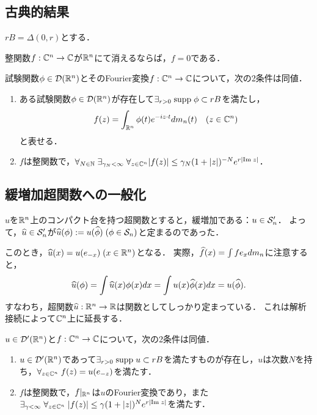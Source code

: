 \documentclass[uplatex,dvipdfmx]{jsreport}
\begin{document}
\subsection{古典的結果}

\begin{notation}
    $rB=\Delta(0,r)$とする．
\end{notation}

\begin{lemma}
    整関数$f:\C^n\to\C$が$\R^n$にて消えるならば，$f=0$である．
\end{lemma}

\begin{theorem}
    試験関数$\phi\in\D(\R^n)$とそのFourier変換$f:\C^n\to\C$について，次の2条件は同値．
    \begin{enumerate}
        \item ある試験関数$\phi\in\D(\R^n)$が存在して$\exists_{r>0}\;\supp\phi\subset rB$を満たし，
        \[f(z)=\int_{\R^n}\phi(t)e^{-iz\cdot t}dm_n(t)\quad(z\in\C^n)\]
        と表せる．
        \item $f$は整関数で，$\forall_{N\in\N}\;\exists_{\gamma_N<\infty}\;\forall_{z\in\C^n}\abs{f(z)}\le\gamma_N(1+\abs{z})^{-N}e^{r\abs{\Im z}}$．
    \end{enumerate}
\end{theorem}

\subsection{緩増加超関数への一般化}

\begin{discussion}
    $u$を$\R^n$上のコンパクト台を持つ超関数とすると，緩増加である：$u\in\S'_n$．
    よって，$\wh{u}\in\S'_n$が$\wh{u}(\phi):=u(\wh{\phi})\;(\phi\in\S_n)$と定まるのであった．

    このとき，$\wh{u}(x)=u(e_{-x})\;(x\in\R^n)$となる．
    実際，$\wh{f}(x)=\int fe_xdm_n$に注意すると，
    \[\wh{u}(\phi)=\int\wh{u}(x)\phi(x)dx=\int u(x)\wh{\phi}(x)dx=u(\wh{\phi}).\]
    すなわち，超関数$\wh{u}:\R^n\to\R$は関数としてしっかり定まっている．
    これは解析接続によって$\C^n$上に延長する．
\end{discussion}

\begin{theorem}
    $u\in\D'(\R^n)$と$f:\C^n\to\C$について，次の2条件は同値．
    \begin{enumerate}
        \item $u\in\D'(\R^n)$であって$\exists_{r>0}\;\supp u\subset rB$を満たすものが存在し，$u$は次数$N$を持ち，$\forall_{z\in\C^n}\;f(z)=u(e_{-z})$を満たす．
        \item $f$は整関数で，$f|_{\R^n}$は$u$のFourier変換であり，また$\exists_{\gamma<\infty}\;\forall_{z\in\C^n}\;\abs{f(z)}\le\gamma(1+\abs{z})^Ne^{r\abs{\Im z}}$を満たす．
    \end{enumerate}
\end{theorem}
\end{document}
